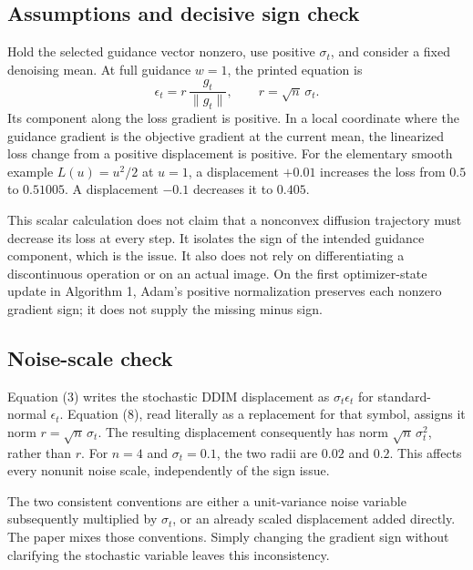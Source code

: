 \documentclass[10pt]{article}
\begin{document}
\subsection*{Assumptions and decisive sign check}
Hold the selected guidance vector nonzero, use positive \(\sigma_t\), and consider a fixed denoising mean. At full guidance \(w=1\), the printed equation is \[\epsilon_t=r\,\frac{g_t}{\|g_t\|},\qquad r=\sqrt n\,\sigma_t.\] Its component along the loss gradient is positive. In a local coordinate where the guidance gradient is the objective gradient at the current mean, the linearized loss change from a positive displacement is positive. For the elementary smooth example \(L(u)=u^2/2\) at \(u=1\), a displacement \(+0.01\) increases the loss from \(0.5\) to \(0.51005\). A displacement \(-0.1\) decreases it to \(0.405\).\par
This scalar calculation does not claim that a nonconvex diffusion trajectory must decrease its loss at every step. It isolates the sign of the intended guidance component, which is the issue. It also does not rely on differentiating a discontinuous operation or on an actual image. On the first optimizer-state update in Algorithm 1, Adam’s positive normalization preserves each nonzero gradient sign; it does not supply the missing minus sign.\par
\subsection*{Noise-scale check}
Equation (3) writes the stochastic DDIM displacement as \(\sigma_t\epsilon_t\) for standard-normal \(\epsilon_t\). Equation (8), read literally as a replacement for that symbol, assigns it norm \(r=\sqrt n\,\sigma_t\). The resulting displacement consequently has norm \(\sqrt n\,\sigma_t^2\), rather than \(r\). For \(n=4\) and \(\sigma_t=0.1\), the two radii are \(0.02\) and \(0.2\). This affects every nonunit noise scale, independently of the sign issue.\par
The two consistent conventions are either a unit-variance noise variable subsequently multiplied by \(\sigma_t\), or an already scaled displacement added directly. The paper mixes those conventions. Simply changing the gradient sign without clarifying the stochastic variable leaves this inconsistency.\par
\end{document}
